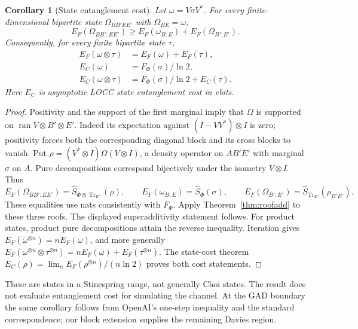 \documentclass[11pt]{article}
\newtheorem{corollary}[theorem]{Corollary}
\begin{document}
\begin{corollary}[State entanglement cost]\label{cor:cost}
Let $\omega=V\sigma V^*$. For every finite-dimensional bipartite state
$\Omega_{BB'EE'}$ with $\Omega_{BE}=\omega$,
\[
 E_F(\Omega_{BB':EE'})\ge E_F(\omega_{B:E})+
                              E_F(\Omega_{B':E'}).
\]
Consequently, for every finite bipartite state $\tau$,
\begin{align*}
 E_F(\omega\otimes\tau)&=E_F(\omega)+E_F(\tau),\\
 E_C(\omega)&=F_\Phi(\sigma)/\ln2,\\
 E_C(\omega\otimes\tau)&=F_\Phi(\sigma)/\ln2+E_C(\tau).
\end{align*}
Here $E_C$ is asymptotic LOCC \emph{state} entanglement cost in ebits.
\end{corollary}
\begin{proof}
Positivity and the support of the first marginal imply that $\Omega$ is
supported on $\operatorname{ran}V\otimes B'\otimes E'$. Indeed its
expectation against $(I-VV^*)\otimes I$ is zero; positivity forces both
the corresponding diagonal block and its cross blocks to vanish.
Put $\rho=(V^*\otimes I)\Omega(V\otimes I)$, a density operator on
$A B'E'$ with marginal $\sigma$ on $A$. Pure decompositions correspond
bijectively under the isometry $V\otimes I$. Thus
\[
 E_F(\Omega_{BB':EE'})=
 \widehat S_{\Phi\otimes\operatorname{Tr}_{E'}}(\rho),\qquad
 E_F(\omega_{B:E})=\widehat S_\Phi(\sigma),\qquad
 E_F(\Omega_{B':E'})=\widehat S_{\operatorname{Tr}_{E'}}(\rho_{B'E'}).
\]
These equalities use nats consistently with $F_\Phi$.
Apply Theorem~\ref{thm:roofadd} to these three roofs. The displayed
superadditivity statement follows.
For product states, product pure decompositions attain the reverse inequality.
Iteration gives $E_F(\omega^{\otimes n})=nE_F(\omega)$, and more generally
$E_F(\omega^{\otimes n}\otimes\tau^{\otimes n})=
nE_F(\omega)+E_F(\tau^{\otimes n})$.
The state-cost theorem $E_C(\rho)=\lim_nE_F(\rho^{\otimes n})/(n\ln2)$
\cite{hht} proves both cost statements.
\end{proof}
These are states in a Stinespring range, not generally Choi states. The result
does not evaluate entanglement cost for simulating the channel. At the GAD
boundary the same corollary follows from OpenAI's one-step inequality and
the standard correspondence; our block extension supplies the remaining
Davies region.
\end{document}
